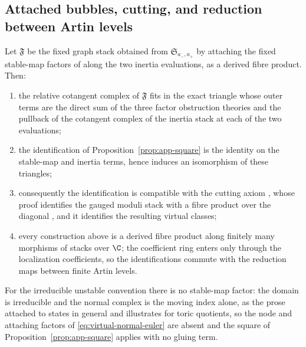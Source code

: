 \subsection{Attached bubbles, cutting, and reduction between Artin levels}
\label{app:cutting}

\begin{proposition}
\label{prop:app-cutting}
Let \(\mathfrak F\) be the fixed graph stack obtained from
\(\mathfrak S_{a_-,a_+}\) by attaching the fixed stable-map factors of
\cite[equations~(54)--(57)]{WoodwardQKIII} along the two inertia evaluations,
as a derived fibre product.  Then:
\begin{enumerate}[label=\textup{(\alph*)}]
\item the relative cotangent complex of \(\mathfrak F\) fits in the exact
triangle whose outer terms are the direct sum of the three factor obstruction
theories and the pullback of the cotangent complex of the inertia stack at
each of the two evaluations;
\item the identification of Proposition~\ref{prop:app-square} is the identity
on the stable-map and inertia terms, hence induces an isomorphism of these
triangles;
\item consequently the identification is compatible with the cutting axiom
\cite[Proposition~7.14(b)]{WoodwardQKIII}, whose proof identifies the gauged
moduli stack with a fibre product over the diagonal
\cite[Proposition~5.21]{WoodwardQKII}, and it identifies the resulting virtual
classes;
\item every construction above is a derived fibre product along finitely many
morphisms of stacks over \(\C\); the coefficient ring enters only through the
localization coefficients, so the identifications commute with the reduction
maps between finite Artin levels.
\end{enumerate}
For the irreducible unstable convention there is no stable-map factor: the
domain is irreducible and the normal
complex is the moving index alone, as the prose attached to
\cite[equation~(59)]{WoodwardQKIII} states in general and
\cite[Example~9.15]{WoodwardQKIII} illustrates for toric quotients, so the node and attaching factors of
\eqref{eq:virtual-normal-euler} are absent and the square of
Proposition~\ref{prop:app-square} applies with no gluing term.
\end{proposition}

